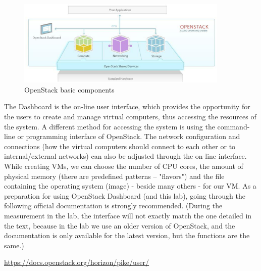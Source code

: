 \documentclass[a4paper]{article}
\begin{document}
\begin{figure}[H]
    \centering
    \includegraphics[width=0.9\textwidth]{figures/components.png}
    \caption{OpenStack basic components}
    \label{fig:oscomponents}
\end{figure}

The Dashboard is the on-line user interface, which provides the opportunity for the users to create and manage virtual
computers, thus accessing the resources of the system. A different method for accessing the system is using the
command-line or programming interface of OpenStack. The network configuration and connections (how the virtual
computers should connect to each other or to internal/external networks) can also be adjusted through the on-line
interface. While creating VMs, we can choose the number of CPU cores, the amount of physical memory
(there are predefined patterns – "flavors") and the file containing the operating system (image) - beside many others -
for our VM.
As a preparation for using OpenStack Dashboard (and this lab), going through the following official documentation is
strongly recommended.
(During the measurement in the lab, the interface will not exactly match the one detailed in the text, because in the
lab we use an older version of OpenStack, and the documentation is only available for the latest version, but the
functions are the same.)

\url{https://docs.openstack.org/horizon/pike/user/}
\end{document}
